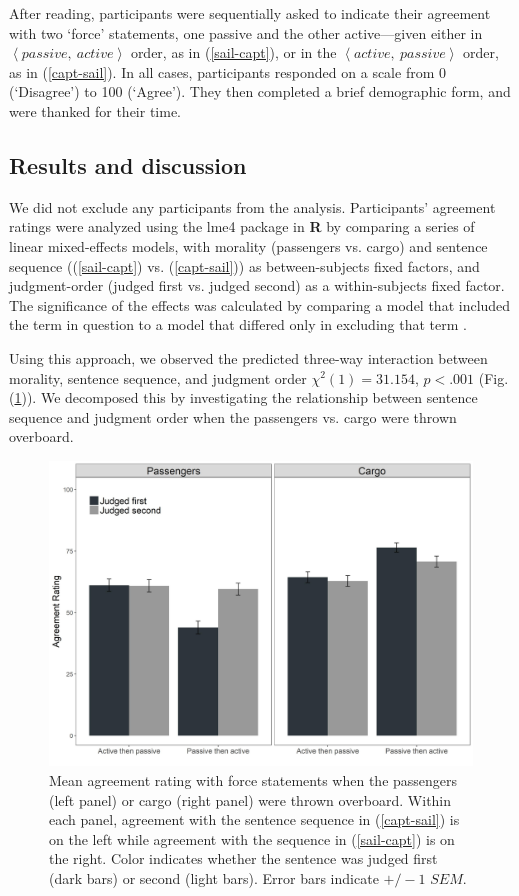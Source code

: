 \documentclass{salt}
\newcommand{\seq}[1]{\left\langle {#1} \right\rangle}
\newcommand{\reff}[1]{(\ref{#1})}
\begin{document}
\noindent After reading, participants were sequentially asked to indicate their agreement with two `force' statements, one passive and the other active---given either in $\seq{passive,~ active}$ order, as in \reff{sail-capt},  or in the $\seq{active,~ passive}$ order, as in \reff{capt-sail}. In all cases, participants responded on a scale from 0 (`Disagree') to 100 (`Agree'). They then completed a brief demographic form, and were thanked for their time.

\subsection{Results and discussion}

We did not exclude any participants from the analysis. Participants' agreement ratings were analyzed using the lme4 package in \textbf{\textsf{R}} \citep{bates2014lme4} by comparing a series of linear mixed-effects models, with morality (passengers vs. cargo) and sentence sequence (\reff{sail-capt} vs. \reff{capt-sail}) as between-subjects fixed factors, and judgment-order (judged first vs. judged second) as a within-subjects fixed factor. The significance of the effects was calculated by comparing a model that included the term in question to a model that differed only in excluding that term \citep{barr2013random}.

Using this approach, we observed the predicted three-way interaction between morality, sentence sequence, and judgment order $\chi^2(1)= 31.154$, $p < .001$ (Fig. \reff{Fig1}). We decomposed this by investigating the relationship between sentence sequence and judgment order when the passengers vs. cargo were thrown overboard.


\begin{figure}[ht]
	\includegraphics[width=1\linewidth]{Fig1} 
	\caption{\small Mean agreement rating with force statements when the passengers (left panel) or cargo (right panel) were thrown overboard. Within each panel, agreement with the sentence sequence in \reff{capt-sail} is on the left while agreement with the sequence in \reff{sail-capt} is on the right. Color indicates whether the sentence was judged first (dark bars) or second (light bars). Error bars indicate $+/-1$ $SEM$.}\label{Fig1}
\end{figure}
\end{document}
